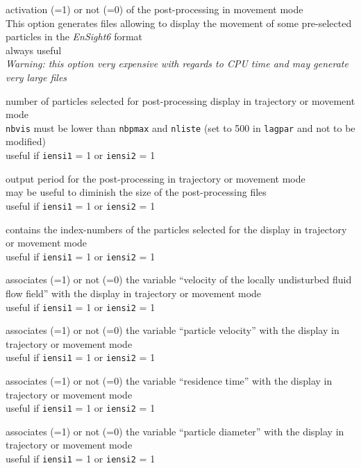 {activation (=1) or not (=0) of the post-processing in movement
mode\\
This option generates files allowing to display the movement of
some pre-selected particles in the \textit{EnSight6} format\\
always useful\\
{\em Warning: this option very expensive with regards to CPU time and may
generate very large files}}

{number of particles selected for post-processing display in trajectory or
movement mode\\
\texttt{nbvis} must be lower than \texttt{nbpmax} and \texttt{nliste}
(set to 500 in \texttt{lagpar} and
not to be modified)\\
useful if \texttt{iensi1} = 1 or \texttt{iensi2} = 1}

{output period for the post-processing in trajectory or
movement mode\\
may be useful to diminish the size of the post-processing files\\
useful if \texttt{iensi1} = 1 or \texttt{iensi2} = 1}

{contains the index-numbers of the particles selected for the display in
trajectory or movement mode\\
useful if \texttt{iensi1} = 1 or \texttt{iensi2} = 1}

{associates (=1) or not (=0) the variable ``velocity of the locally
undisturbed fluid flow field'' with the display in trajectory or
movement mode\\
useful if \texttt{iensi1} = 1 or \texttt{iensi2} = 1}

{associates (=1) or not (=0) the variable ``particle velocity''
with the display in trajectory or movement mode\\
useful if \texttt{iensi1} = 1 or \texttt{iensi2} = 1}

{associates (=1) or not (=0) the variable ``residence time''
with the display in trajectory or movement mode\\
useful if \texttt{iensi1} = 1 or \texttt{iensi2} = 1}

{associates (=1) or not (=0) the variable ``particle diameter''
with the display in trajectory or movement mode\\
useful if \texttt{iensi1} = 1 or \texttt{iensi2} = 1}

